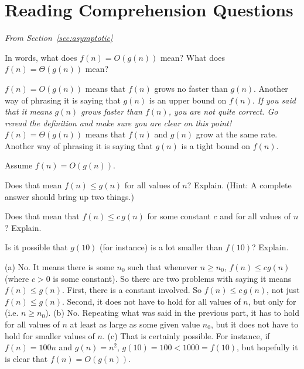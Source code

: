 \section{Reading Comprehension Questions}

\noindent
{\em From Section~\ref{sec:asymptotic}}

\begin{requ}
In words, what does $f(n)=O(g(n))$ mean?
What does $f(n)=\Theta(g(n))$ mean?
\begin{requanswer}
$f(n)=O(g(n))$ means that $f(n)$ grows no faster than $g(n)$.
Another way of phrasing it is saying that $g(n)$ is an upper bound on $f(n)$.
{\em If you said that it means $g(n)$ grows faster than $f(n)$, you are not quite correct.
Go reread the definition and make sure you are clear on this point!}
$f(n)=\Theta(g(n))$ means that $f(n)$ and $g(n)$ grow at the same rate.
Another way of phrasing it is saying that $g(n)$ is a tight bound on $f(n)$.
\end{requanswer}
\end{requ}


\begin{requ}
Assume $f(n)=O(g(n))$.
\begin{lenum}
\item Does that mean $f(n)\leq g(n)$ for all values of $n$? Explain. (Hint: A complete answer should bring up two things.)
\item Does that mean that $f(n)\leq c\, g(n)$ for some constant $c$ and for all values of $n$? Explain.
\item Is it possible that $g(10)$ (for instance) is a lot smaller than $f(10)$? Explain.
\end{lenum}
\begin{requanswer}
(a) No. It means there is some $n_0$ such that whenever $n\geq n_0$, $f(n)\leq c g(n)$ (where $c>0$ is some constant).
So there are two problems with saying it means $f(n)\leq g(n)$. First, there is a constant involved.
So $f(n)\leq c\, g(n)$, not just $f(n)\leq g(n)$. Second, it does not have to hold for all values of $n$, 
but only for (i.e. $n\geq n_0$).
(b) No. Repeating what was said in the previous part, it has to hold for all values of $n$ at least as large as some
given value $n_0$, but it does not have to hold for smaller values of $n$.
(c) That is certainly possible. For instance, if $f(n)=100n$ and $g(n)=n^2$, $g(10)=100<1000=f(10)$,
but hopefully it is clear that $f(n)=O(g(n))$.
\end{requanswer}
\end{requ}

